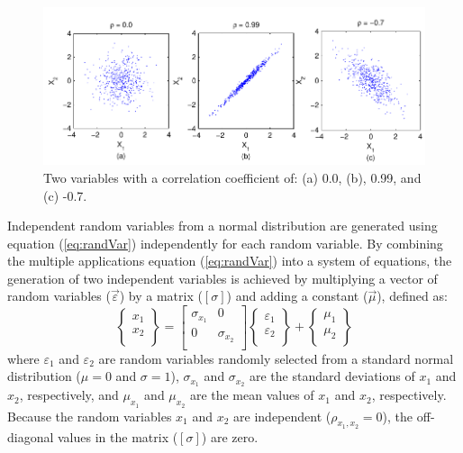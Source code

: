 \documentclass[12pt,oneside]{book}
\begin{document}
\begin{figure}[tb]
    \begin{center}
        \includegraphics[width=\textwidth]{figures/rand/correlation.pdf}
    \end{center}
    \caption{Two variables with a correlation coefficient of: (a) 0.0, (b), 0.99, and (c) -0.7.}
    \label{fig:rand:correl}
\end{figure}

Independent random variables from a normal distribution are generated using equation
(\ref{eq:randVar}) independently for each random variable. By combining the multiple applications
equation (\ref{eq:randVar}) into a system of equations, the generation of two independent variables
is achieved by multiplying a vector of random variables ($\vec{\varepsilon}$) by a matrix
($[\sigma]$) and adding a constant ($\vec{\mu}$), defined as:
\begin{equation}
    \left\{
        \begin{array}{c}
            x_1 \\
            x_2 \\
        \end{array}
    \right\} 
    =
    \left[
        \begin{array}{ccc}
            \sigma_{x_1} & 0 \\
            0 & \sigma_{x_2} \\
        \end{array}
    \right]
    \left\{
        \begin{array}{c}
            \varepsilon_1 \\
            \varepsilon_2 \\
        \end{array}
    \right\}
    + 
    \left\{
        \begin{array}{c}
            \mu_1 \\
            \mu_2 \\
        \end{array}
    \right\}
    \label{eq:linearSystem:uncorrel}
\end{equation}
where $\varepsilon_1$ and $\varepsilon_2$ are random variables randomly selected from a standard
normal distribution ($\mu=0$ and $\sigma=1$), $\sigma_{x_1}$ and $\sigma_{x_2}$ are the standard
deviations of $x_1$ and $x_2$, respectively, and $\mu_{x_1}$ and $\mu_{x_2}$ are the mean values of
$x_1$ and $x_2$, respectively.  Because the random variables $x_1$ and $x_2$ are independent
($\rho_{x_1,x_2}=0$), the off-diagonal values in the matrix ($[\sigma]$) are zero.  
\end{document}
